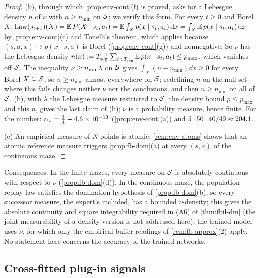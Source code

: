 \begin{proof}
(b), through which \cref{prop:env-cont}(f) is proved, asks for a Lebesgue density $n$ of $\nu$ with $n\ge n_{\min}$ on $\cS$; we verify this form.
For every $t\ge0$ and Borel $X$, $\law(s_{t+1})(X)=\E\,P(X\mid s_t,a_t)=\E\int_Xp(x\mid s_t,a_t)\dd x=\int_X\E\,p(x\mid s_t,a_t)\dd x$ by \cref{prop:env-cont}(c) and Tonelli's theorem, which applies because $(s,a,x)\mapsto p(x\mid s,a)$ is Borel (\cref{prop:env-cont}(g)) and nonnegative.
So $\nu$ has the Lebesgue density $n(x):=T_{\mathrm{seg}}^{-1}\sum_{t<T_{\mathrm{seg}}}\E\,p(x\mid s_t,a_t)\le p_{\max}$, which vanishes off $\cS$.
The inequality $\nu\ge n_{\min}\Leb$ on $\cS$ gives $\int_X(n-n_{\min})\dd x\ge0$ for every Borel $X\subseteq\cS$, so $n\ge n_{\min}$ almost everywhere on $\cS$; redefining $n$ on the null set where this fails changes neither $\nu$ nor the conclusions, and then $n\ge n_{\min}$ on all of $\cS$.
(b), with $\lambda$ the Lebesgue measure restricted to $\cS$, the density bound $p\le p_{\max}$ and this $n$, gives the last claim of (b); $\nu$ is a probability measure, hence finite.
For the number: $\alpha_\star=\frac14-\vn{const.alpha_gap}{4.6\times10^{-13}}$ (\cref{prop:env-cont}(a)) and $5\cdot50\cdot40/49\approx\vn{const.n_min_den}{204.1}$.

(c) An empirical measure of $N$ points is atomic; \cref{rem:env-atoms} shows that an atomic reference measure triggers \cref{prop:fb-dom}(a) at every $(s,a)$ of the continuous maze.
\end{proof}

\noindent Consequences. In the finite mazes, every measure on $\cS$ is absolutely continuous with respect to $\nu$ (\cref{prop:fb-dom}(d)). In the continuous maze, the population replay law satisfies the domination hypothesis of \cref{prop:fb-dom}(b), so every successor measure, the expert's included, has a bounded $\nu$-density; this gives the absolute continuity and square integrability required in (A6) of \cref{thm:fbil-dm} (the joint measurability of a density version is not addressed here); the trained model uses $\hat\nu$, for which only the empirical-buffer readings of \cref{rem:fb-approx}(2) apply. No statement here concerns the accuracy of the trained networks.

\subsection{Cross-fitted plug-in signals}\label{sec:env-crossfit}

